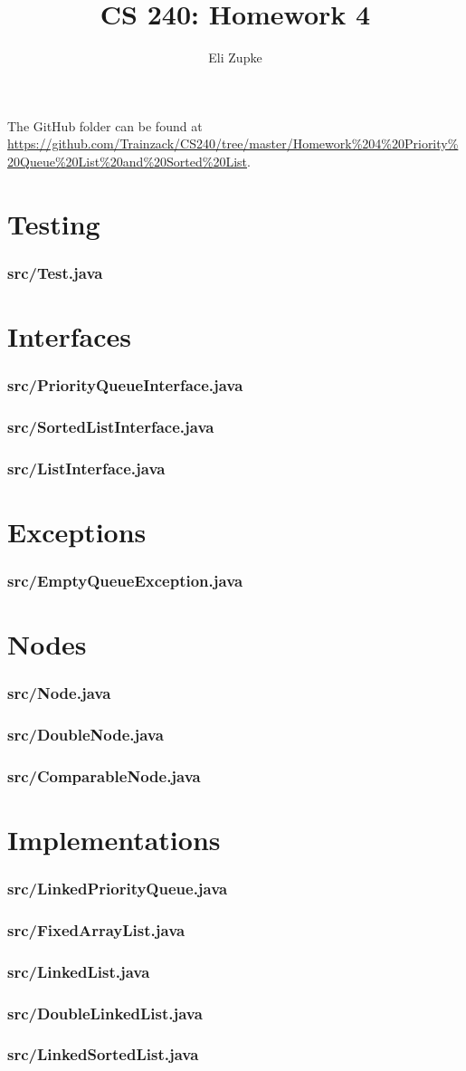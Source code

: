 \documentclass[letterpaper, 10pt]{article}
\title{CS 240: Homework 4}
\author{Eli Zupke}
\newcommand{\inputcode}[1]{
	
	\needspace{0.1\textheight}
	\section{#1}
	
	\vspace{5em}
	\pagebreak[3]
	
}
\begin{document}
\maketitle

The GitHub folder can be found at \url{https://github.com/Trainzack/CS240/tree/master/Homework%204%20Priority%20Queue%20List%20and%20Sorted%20List}.

\tableofcontents

\part{Testing}
\inputcode{src/Test.java}
\part{Interfaces}
\inputcode{src/PriorityQueueInterface.java}
\inputcode{src/SortedListInterface.java}
\inputcode{src/ListInterface.java}
\part{Exceptions}
\inputcode{src/EmptyQueueException.java}
\part{Nodes}
\inputcode{src/Node.java}
\inputcode{src/DoubleNode.java}
\inputcode{src/ComparableNode.java}
\part{Implementations}
\inputcode{src/LinkedPriorityQueue.java}
\inputcode{src/FixedArrayList.java}
\inputcode{src/LinkedList.java}
\inputcode{src/DoubleLinkedList.java}
\inputcode{src/LinkedSortedList.java}
\end{document}
